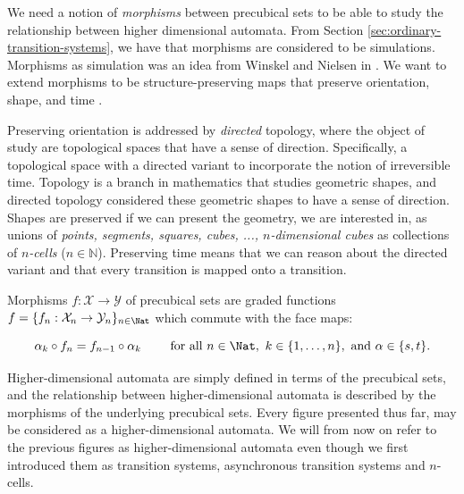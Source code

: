     We need a notion of \emph{morphisms} between precubical sets to be able to study the relationship between higher dimensional automata. From Section \ref{sec:ordinary-transition-systems}, we have that morphisms are considered to be simulations. Morphisms as simulation was an idea from Winskel and Nielsen in \cite{winskel95modelsCategory}. We want to extend morphisms to be structure-preserving maps that preserve orientation, shape, and time \cite[Section 2.2]{Goubault95PhDThesis}.
    
    Preserving orientation is addressed by \emph{directed} topology, where the object of study are topological spaces that have a sense of direction. Specifically, a topological space with a directed variant to incorporate the notion of irreversible time. Topology is a branch in mathematics that studies geometric shapes, and directed topology considered these geometric shapes to have a sense of direction. Shapes are preserved if we can present the geometry, we are interested in, as unions of \emph{points, segments, squares, cubes, ..., $n$-dimensional cubes} as collections of \emph{$n$-cells} ($n \in \mathbb{N}$). Preserving time means that we can reason about the directed variant and that every transition is mapped onto a transition.
    
    \begin{definition}
        \label{def:morphism-of-precubical-set}
        Morphisms $f: \mathcal{X}\to \mathcal{Y}$ of precubical sets are graded functions $f=\{ f_n: \mathcal{X}_n\to \mathcal{Y}_n\}_{ n\in \Nat}$ which commute with the face maps:
        
        \begin{equation*}
            \alpha_k\circ f_n= f_{ n- 1}\circ \alpha_k \qquad\ \text{for all}\ n\in \Nat,\ k\in\{ 1,\dots, n\},\ \text{and}\ \alpha\in\{ s, t\}.
        \end{equation*}
    \end{definition}
    

    Higher-dimensional automata are simply defined in terms of the precubical sets, and the relationship between higher-dimensional automata is described by the morphisms of the underlying precubical sets. Every figure presented thus far, may be considered as a higher-dimensional automata. We will from now on refer to the previous figures as higher-dimensional automata even though we first introduced them as transition systems, asynchronous transition systems and $n$-cells.
    
